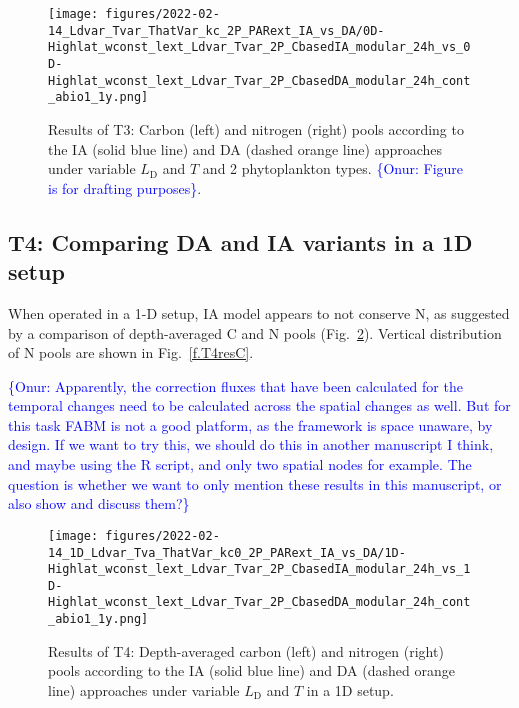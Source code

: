 \documentclass[gmd, manuscript]{copernicus}
\newcommand{\onur}[1]{\textcolor{blue}{\{Onur: #1\}}}
\begin{document}
\begin{figure}[ht!]
\texttt{[image: figures/2022-02-14\_Ldvar\_Tvar\_ThatVar\_kc\_2P\_PARext\_IA\_vs\_DA/0D-Highlat\_wconst\_lext\_Ldvar\_Tvar\_2P\_CbasedIA\_modular\_24h\_vs\_0D-Highlat\_wconst\_lext\_Ldvar\_Tvar\_2P\_CbasedDA\_modular\_24h\_cont\_abio1\_1y.png]}
\caption{Results of T3: Carbon (left) and nitrogen (right) pools according to the IA (solid blue line) and DA (dashed orange line) approaches under variable $L_{\text{D}}$ and $T$ and 2 phytoplankton types. \onur{Figure is for drafting purposes}.\label{f.T3res}}
\end{figure}



\subsection{T4: Comparing DA and IA variants in a 1D setup}\label{s.resT4}
When operated in a 1-D setup, IA model appears to not conserve N, as suggested by a comparison of depth-averaged C and N pools (Fig.~\ref{f.T4resTS}). Vertical distribution of N pools are shown in Fig.~\ref{f.T4resC}. 

\onur{Apparently, the correction fluxes that have been calculated for the temporal changes need to be calculated across the spatial changes as well. But for this task FABM is not a good platform, as the framework is space unaware, by design. If we want to try this, we should do this in another manuscript I think, and maybe using the R script, and only two spatial nodes for example. The question is whether we want to only mention these results in this manuscript, or also show and discuss them?}

\begin{figure}[ht!]
\texttt{[image: figures/2022-02-14\_1D\_Ldvar\_Tva\_ThatVar\_kc0\_2P\_PARext\_IA\_vs\_DA/1D-Highlat\_wconst\_lext\_Ldvar\_Tvar\_2P\_CbasedIA\_modular\_24h\_vs\_1D-Highlat\_wconst\_lext\_Ldvar\_Tvar\_2P\_CbasedDA\_modular\_24h\_cont\_abio1\_1y.png]}
\caption{Results of T4: Depth-averaged carbon (left) and nitrogen (right) pools according to the IA (solid blue line) and DA (dashed orange line) approaches under variable $L_{\text{D}}$ and $T$ in a 1D setup.\label{f.T4resTS}}
\end{figure}
\end{document}
